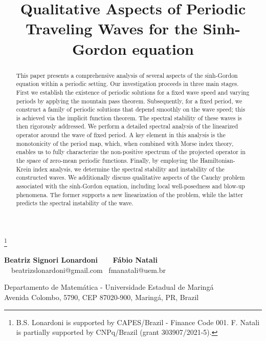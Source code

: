\documentclass[12pt,reqno,a4paper]{amsart} %
\numberwithin{equation}{section}
\numberwithin{figure}{section}
\begin{document}
\vglue-1cm \hskip1cm
\title[Periodic waves for the sinh-Gordon equation]{Qualitative Aspects of Periodic Traveling Waves for the Sinh-Gordon equation} 

\begin{center}
\thanks{B.S. Lonardoni is supported by CAPES/Brazil - Finance Code 001. F. Natali is partially supported by CNPq/Brazil (grant 303907/2021-5).
}
\maketitle


{\bf Beatriz Signori Lonardoni \quad \qquad \ \ \ F\'abio Natali \ }\\

{\quad \quad \ \ beatrizslonardoni@gmail.com \quad \quad \quad \quad  \ fmanatali@uem.br \quad}

\vspace{2mm}

{Departamento de Matem\'atica - Universidade Estadual de Maring\'a\\
	Avenida Colombo, 5790, CEP 87020-900, Maring\'a, PR, Brazil}\\

\vspace{3mm}
\end{center}

\begin{abstract}
This paper presents a comprehensive analysis of several aspects of the sinh-Gordon equation within a periodic setting. Our investigation proceeds in three main stages. First we establish the existence of periodic solutions for a fixed wave speed and varying periods by applying the mountain pass theorem. Subsequently, for a fixed period, we construct a family of periodic solutions that depend smoothly on the wave speed; this is achieved via the implicit function theorem. The spectral stability of these waves is then rigorously addressed. We perform a detailed spectral analysis of the linearized operator around the wave of fixed period. A key element in this analysis is the monotonicity of the period map, which, when combined with Morse index theory, enables us to fully characterize the non-positive spectrum of the projected operator in the space of zero-mean periodic functions. Finally, by employing the Hamiltonian-Krein index analysis, we determine the spectral stability and instability of the constructed waves. We additionally discuss qualitative aspects of the Cauchy problem associated with the sinh-Gordon equation, including local well-posedness and blow-up phenomena. The former supports a new linearization of the problem, while the latter predicts the spectral instability of the wave.
\end{abstract}
\end{document}
